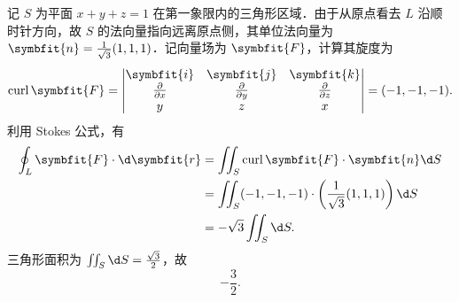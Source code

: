 \begin{solution}

    记 $S$ 为平面 $x+y+z=1$ 在第一象限内的三角形区域．由于从原点看去 $L$ 沿顺时针方向，故 $S$ 的法向量指向远离原点侧，其单位法向量为 $\symbfit{n} = \frac{1}{\sqrt{3}}(1, 1, 1)$．记向量场为 $\symbfit{F}$，计算其旋度为
    \begin{equation}
        \operatorname{curl} \symbfit{F} = \left| \begin{matrix} \symbfit{i} & \symbfit{j} & \symbfit{k} \\ \frac{\partial}{\partial x} & \frac{\partial}{\partial y} & \frac{\partial}{\partial z} \\ y & z & x \end{matrix} \right| = (-1, -1, -1).
    \end{equation}
    利用 Stokes 公式，有
    \begin{equation}
        \label{eq:stokes-1}
        \begin{aligned}
            \oint_L \symbfit{F} \cdot \d \symbfit{r} & = \iint_S \operatorname{curl} \symbfit{F} \cdot \symbfit{n} \d S             \\
                                                     & = \iint_S (-1, -1, -1) \cdot \left( \frac{1}{\sqrt{3}}(1, 1, 1) \right) \d S \\
                                                     & = -\sqrt{3} \iint_S \d S.
        \end{aligned}
    \end{equation}
    三角形面积为 $\iint_S \d S = \frac{\sqrt{3}}{2}$，故
    \begin{equation}
        \label{eq:res-1}
        \boxed{-\frac{3}{2}}.
    \end{equation}



\end{solution}
